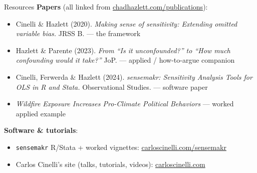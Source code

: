 \documentclass[xcolor=dvipsnames]{beamer}
\begin{document}
\begin{frame}{Resources}
\small
\textbf{Papers} (all linked from \href{https://chadhazlett.com/publications.html}{chadhazlett.com/publications}):
\begin{itemize}
\item Cinelli \& Hazlett (2020). \emph{Making sense of sensitivity: Extending omitted variable bias.} JRSS B. --- the framework
\item Hazlett \& Parente (2023). \emph{From ``Is it unconfounded?'' to ``How much confounding would it take?''} JoP. --- applied / how-to-argue companion
\item Cinelli, Ferwerda \& Hazlett (2024). \emph{sensemakr: Sensitivity Analysis Tools for OLS in R and Stata.} Observational Studies. --- software paper
\item \emph{Wildfire Exposure Increases Pro-Climate Political Behaviors} --- worked applied example
\end{itemize}
\medskip
\textbf{Software \& tutorials}:
\begin{itemize}
\item \texttt{sensemakr} R/Stata + worked vignettes: \href{http://carloscinelli.com/sensemakr/}{carloscinelli.com/sensemakr}
\item Carlos Cinelli's site (talks, tutorials, videos): \href{http://carloscinelli.com}{carloscinelli.com}
\end{itemize}
\end{frame}
\end{document}
